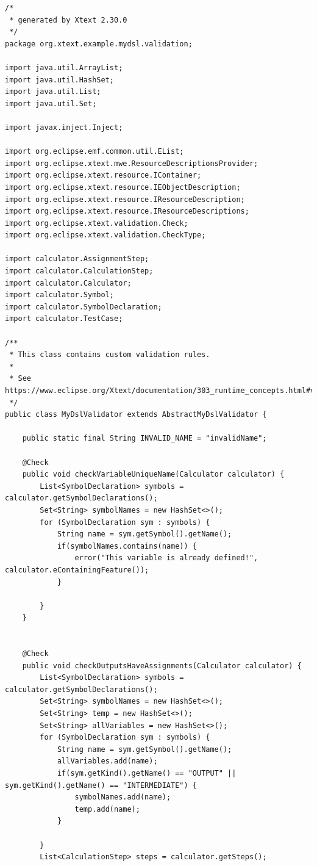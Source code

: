 \documentclass[11pt,fleqn]{article}
\begin{document}
\begin{lstlisting}[caption={Xtext Validation},label={lst:xtexvalidation}]
/*
 * generated by Xtext 2.30.0
 */
package org.xtext.example.mydsl.validation;

import java.util.ArrayList;
import java.util.HashSet;
import java.util.List;
import java.util.Set;

import javax.inject.Inject;

import org.eclipse.emf.common.util.EList;
import org.eclipse.xtext.mwe.ResourceDescriptionsProvider;
import org.eclipse.xtext.resource.IContainer;
import org.eclipse.xtext.resource.IEObjectDescription;
import org.eclipse.xtext.resource.IResourceDescription;
import org.eclipse.xtext.resource.IResourceDescriptions;
import org.eclipse.xtext.validation.Check;
import org.eclipse.xtext.validation.CheckType;

import calculator.AssignmentStep;
import calculator.CalculationStep;
import calculator.Calculator;
import calculator.Symbol;
import calculator.SymbolDeclaration;
import calculator.TestCase;

/**
 * This class contains custom validation rules. 
 *
 * See https://www.eclipse.org/Xtext/documentation/303_runtime_concepts.html#validation
 */
public class MyDslValidator extends AbstractMyDslValidator {
	
	public static final String INVALID_NAME = "invalidName";

	@Check
	public void checkVariableUniqueName(Calculator calculator) {
		List<SymbolDeclaration> symbols = calculator.getSymbolDeclarations();
		Set<String> symbolNames = new HashSet<>();
		for (SymbolDeclaration sym : symbols) {
			String name = sym.getSymbol().getName();
			if(symbolNames.contains(name)) {
				error("This variable is already defined!", calculator.eContainingFeature());
			}
			
		}
	}
	
	
	@Check
	public void checkOutputsHaveAssignments(Calculator calculator) {
		List<SymbolDeclaration> symbols = calculator.getSymbolDeclarations();
		Set<String> symbolNames = new HashSet<>();
		Set<String> temp = new HashSet<>();
		Set<String> allVariables = new HashSet<>();
		for (SymbolDeclaration sym : symbols) {
			String name = sym.getSymbol().getName();
			allVariables.add(name);
			if(sym.getKind().getName() == "OUTPUT" || sym.getKind().getName() == "INTERMEDIATE") {
				symbolNames.add(name);
				temp.add(name);
			}
			
		}
		List<CalculationStep> steps = calculator.getSteps();
		

\end{lstlisting}
\end{document}
